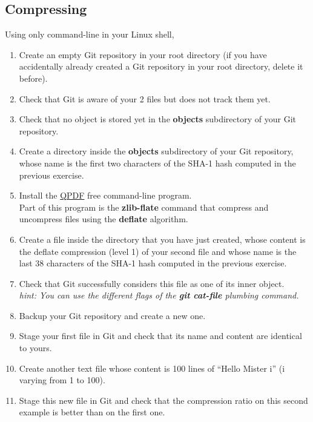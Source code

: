 \subsection{Compressing}  %
Using only command-line in your Linux shell,
\begin{enumerate}
    \item Create an empty Git repository in your root directory
          (if you have accidentally already created a Git repository in your root directory, delete it before).
    \item Check that Git is aware of your 2 files but does not track them yet.
    \item Check that no object is stored yet in the \textbf{objects} subdirectory of your Git repository.
    \item Create a directory inside the \textbf{objects} subdirectory of your Git repository,
          whose name is the first two characters of the SHA-1 hash computed in the previous exercise.
    \item Install the \href{https://en.wikipedia.org/wiki/QPDF}{QPDF} free command-line program. \\
          Part of this program is the \textbf{zlib-flate} command that compress and uncompress files
          using the \textbf{deflate} algorithm.
    \item Create a file inside the directory that you have just created,
          whose content is the deflate compression (level 1) of your second file
          and whose name is the last 38 characters of the SHA-1 hash computed in the previous exercise.
    \item Check that Git successfully considers this file as one of its inner object. \\
        \textit{hint: You can use the different flags of the \textbf{git cat-file} plumbing command.}
    \item Backup your Git repository and create a new one.
    \item Stage your first file in Git and check that its name and content are identical to yours.
    \item Create another text file whose content is 100 lines of ``Hello Mister i'' (i varying from 1 to 100).
    \item Stage this new file in Git
          and check that the compression ratio on this second example is better than on the first one.
\end{enumerate}

